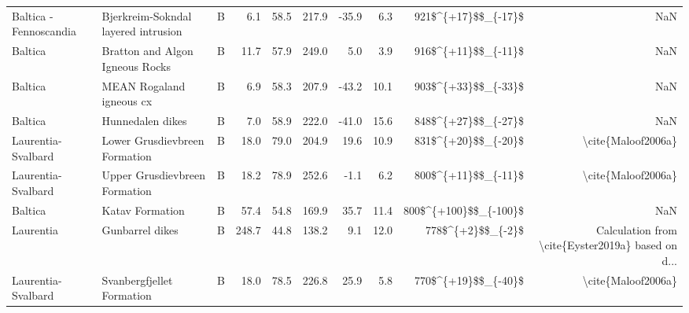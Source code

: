\begin{longtable}{p{1 in}p{1 in}rrrrrrrr}
        Baltica - Fennoscandia &                Bjerkreim-Sokndal layered intrusion &      B &       6.1 &      58.5 & 217.9 & -35.9 &       6.3 &    921\$\textasciicircum \{+17\}\$\$\_\{-17\}\$ &                                                NaN \\
                       Baltica &                    Bratton and Algon Igneous Rocks &      B &      11.7 &      57.9 & 249.0 &   5.0 &       3.9 &    916\$\textasciicircum \{+11\}\$\$\_\{-11\}\$ &                                                NaN \\
                       Baltica &                           MEAN Rogaland igneous cx &      B &       6.9 &      58.3 & 207.9 & -43.2 &      10.1 &    903\$\textasciicircum \{+33\}\$\$\_\{-33\}\$ &                                                NaN \\
                       Baltica &                                   Hunnedalen dikes &      B &       7.0 &      58.9 & 222.0 & -41.0 &      15.6 &    848\$\textasciicircum \{+27\}\$\$\_\{-27\}\$ &                                                NaN \\
            Laurentia-Svalbard &                      Lower Grusdievbreen Formation &      B &      18.0 &      79.0 & 204.9 &  19.6 &      10.9 &    831\$\textasciicircum \{+20\}\$\$\_\{-20\}\$ &                                 \textbackslash cite\{Maloof2006a\} \\
            Laurentia-Svalbard &                      Upper Grusdievbreen Formation &      B &      18.2 &      78.9 & 252.6 &  -1.1 &       6.2 &    800\$\textasciicircum \{+11\}\$\$\_\{-11\}\$ &                                 \textbackslash cite\{Maloof2006a\} \\
                       Baltica &                                    Katav Formation &      B &      57.4 &      54.8 & 169.9 &  35.7 &      11.4 &  800\$\textasciicircum \{+100\}\$\$\_\{-100\}\$ &                                                NaN \\
                     Laurentia &                                    Gunbarrel dikes &      B &     248.7 &      44.8 & 138.2 &   9.1 &      12.0 &      778\$\textasciicircum \{+2\}\$\$\_\{-2\}\$ &  Calculation from \textbackslash cite\{Eyster2019a\} based on d... \\
            Laurentia-Svalbard &                          Svanbergfjellet Formation &      B &      18.0 &      78.5 & 226.8 &  25.9 &       5.8 &    770\$\textasciicircum \{+19\}\$\$\_\{-40\}\$ &                                 \textbackslash cite\{Maloof2006a\} \\

\end{longtable}
